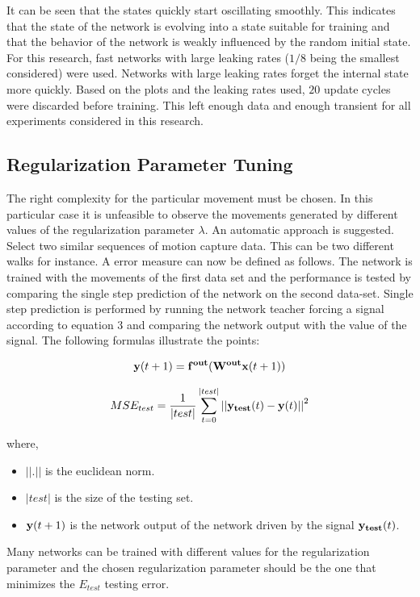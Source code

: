 \documentclass[letterpaper,9pt]{article}
\newcommand{\vectornorm}[1]{\left|\left|#1\right|\right|}
\begin{document}
It can be seen that the states quickly start oscillating smoothly. This indicates that the state of the network is evolving into a state suitable for training and that the behavior of the network is weakly influenced by the random initial state. For this research, fast networks with large leaking rates ($1/8$ being the smallest considered) were used. Networks with large leaking rates forget the internal state more quickly. Based on the plots and the leaking rates used, $20$ update cycles were discarded before training. This left enough data and enough transient for all experiments considered in this research. 

\subsection{Regularization Parameter Tuning}

The right complexity for the particular movement must be chosen. In this particular case it is unfeasible to observe the movements generated by different values of the regularization parameter $\lambda$. An automatic approach is suggested. Select two similar sequences of motion capture data. This can be two different walks for instance. A error measure can now be defined as follows. The network is trained with the movements of the first data set and the performance is tested by comparing the single step prediction of the network on the second data-set. Single step prediction is performed by running the network teacher forcing a signal according to equation 3 and comparing the network output with the value of the signal. The following formulas illustrate the points:

\[
{\bf y}(t+1)={\bf f^{out}}({\bf W^{out}x}(t+1))
\]

\begin{equation}
MSE_{test} = \frac{1}{|test|}\sum_{t=0}^{|test|}\vectornorm{{\bf y_{test}}(t) - {\bf y} (t)}^2
\end{equation}

where,
\begin{itemize}
\item $\vectornorm{.}$ is the euclidean norm.
\item $|test|$ is the size of the testing set.
\item ${\bf y}(t+1)$ is the network output of the network driven by the signal ${\bf y_{test}}(t)$.
\end{itemize}

Many networks can be trained with different values for the regularization parameter and the chosen regularization parameter should be the one that minimizes the $E_{test}$ testing error.
\end{document}

